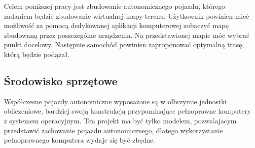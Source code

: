     Celem poniższej pracy jest zbudowanie autonomicznego pojazdu, 
    którego zadaniem będzie zbudowanie wirtualnej mapy terenu.
    Użytkownik powinien mieć możliwość za pomocą dedykowanej aplikacji komputerowej zobaczyć mapę zbudowaną przez poszczególne urządzenia.
    Na przedstawionej mapie móc wybrać punkt docelowy. 
    Następnie samochód powinien zaproponować optymalną trasę, którą będzie podążał.


    \subsection{Środowisko sprzętowe}
        Współczesne pojazdy autonomiczne wyposażone są w olbrzymie jednostki obliczeniowe, bardziej swoją konstrukcją przypominające pełnoprawne komputery z systemem operacyjnym.
        Ten projekt ma być tylko modelem, pozwalajacym przedstawić zachowanie pojazdu autonomicznego, dlatego wykorzystanie pełnoprawnego komputera wydaje się być zbędne.

